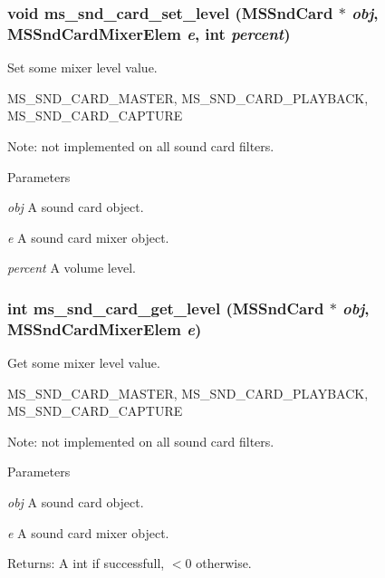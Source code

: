 \subsubsection[{ms\_\-snd\_\-card\_\-set\_\-level}]{\setlength{\rightskip}{0pt plus 5cm}void ms\_\-snd\_\-card\_\-set\_\-level ({\bf MSSndCard} $\ast$ {\em obj}, \/  {\bf MSSndCardMixerElem} {\em e}, \/  int {\em percent})}\label{group__mediastreamer2__soundcardfilter_gaf52ce0d93b3e4d53feabe962456b5c16}
Set some mixer level value.


\begin{DoxyPre}
   MS\_SND\_CARD\_MASTER,
   MS\_SND\_CARD\_PLAYBACK,
   MS\_SND\_CARD\_CAPTURE
 \end{DoxyPre}
 Note: not implemented on all sound card filters.


\begin{DoxyParams}{Parameters}
\item[{\em obj}]A sound card object. \item[{\em e}]A sound card mixer object. \item[{\em percent}]A volume level. \end{DoxyParams}
\subsubsection[{ms\_\-snd\_\-card\_\-get\_\-level}]{\setlength{\rightskip}{0pt plus 5cm}int ms\_\-snd\_\-card\_\-get\_\-level ({\bf MSSndCard} $\ast$ {\em obj}, \/  {\bf MSSndCardMixerElem} {\em e})}\label{group__mediastreamer2__soundcardfilter_ga23baf9854671654f982944f2deeca905}
Get some mixer level value.


\begin{DoxyPre}
   MS\_SND\_CARD\_MASTER,
   MS\_SND\_CARD\_PLAYBACK,
   MS\_SND\_CARD\_CAPTURE
 \end{DoxyPre}
 Note: not implemented on all sound card filters.


\begin{DoxyParams}{Parameters}
\item[{\em obj}]A sound card object. \item[{\em e}]A sound card mixer object.\end{DoxyParams}
Returns: A int if successfull, $<$0 otherwise. 
